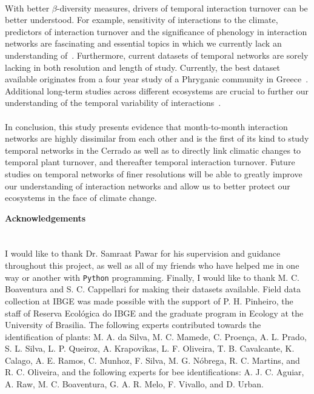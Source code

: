 \documentclass[11pt]{article}
\begin{document}
\\
With better $\beta$-diversity measures, drivers of temporal interaction turnover can be better understood. For example, sensitivity of interactions to the climate, predictors of interaction turnover and the significance of phenology in interaction networks are fascinating and essential topics in which we currently lack an understanding of~\citep{Poisot2012}. Furthermore, current datasets of temporal networks are sorely lacking in both resolution and length of study. Currently, the best dataset available originates from a four year study of a Phryganic community in Greece~\citep{Petanidou1991}. Additional long-term studies across different ecosystems are crucial to further our understanding of the temporal variability of interactions~\citep{Burkle2011}.\\
\\
In conclusion, this study presents evidence that month-to-month interaction networks are highly dissimilar from each other and is the first of its kind to study temporal networks in the Cerrado as well as to directly link climatic changes to temporal plant turnover, and thereafter temporal interaction turnover. Future studies on temporal networks of finer resolutions will be able to greatly improve our understanding of interaction networks and allow us to better protect our ecosystems in the face of climate change.

\newpage 
\vspace*{\fill}

{\huge\bfseries Acknowledgements} 
\label{sec: acknowledgements} \\
\\
\\
\large{I would like to thank Dr. Samraat Pawar for his supervision and guidance throughout this project, as well as  all of my friends who have helped me in one way or another with \texttt{Python} programming. Finally, I would like to thank M. C. Boaventura and S. C. Cappellari for making their datasets available. Field data collection at IBGE was made possible with the support of P. H. Pinheiro, the staff of Reserva Ecol\'{o}gica do IBGE and the graduate program in Ecology at the University of Brasilia. The following experts contributed towards the identification of plants: M. A. da Silva, M. C. Mamede, C. Proen\c{c}a, A. L. Prado, S. L. Silva, L. P. Queiroz, A. Krapovikas, L. F. Oliveira, T. B. Cavalcante, K. Calago, A. E. Ramos, C. Munhoz, F. Silva, M. G. N\'{o}brega, R. C. Martins, and R. C. Oliveira, and the following experts for bee identifications: A. J. C. Aguiar, A. Raw, M. C. Boaventura, G. A. R. Melo, F. Vivallo, and D. Urban.}
\vfill
\end{document}
